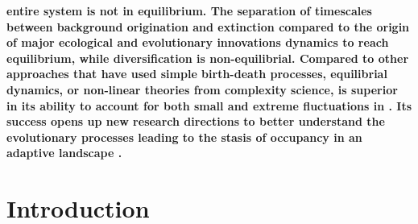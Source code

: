 \documentclass[12pt]{article}
\newenvironment{sciabstract} 
{\bfseries}
{}
\providecommand{\DIFadd}[1]{{\color{blue}{#1}}} %
\providecommand{\DIFdel}[1]{{\protect\color{red}\sout{}}}                      %
\providecommand{\DIFaddbegin}{} %
\providecommand{\DIFaddend}{} %
\providecommand{\DIFdelbegin}{} %
\providecommand{\DIFdelend}{} %
\newcommand{\DIFscaledelfig}{0.5}
\newlength{\DIFdelgraphicswidth} %
\newlength{\DIFdelgraphicsheight} %
\newcommand{\DIFaddincludegraphics}[2][]{{\color{blue}\fbox{\DIFOincludegraphics[#1]{#2}}}} %
\newcommand{\DIFdelincludegraphics}[2][]{%
\sbox{\DIFdelgraphicsbox}{\DIFOincludegraphics[#1]{#2}}%
\settoboxwidth{\DIFdelgraphicswidth}{\DIFdelgraphicsbox} %
\settoboxtotalheight{\DIFdelgraphicsheight}{\DIFdelgraphicsbox} %
\scalebox{\DIFscaledelfig}{%
\parbox[b]{\DIFdelgraphicswidth}{\usebox{\DIFdelgraphicsbox}\\[-\baselineskip] \rule{\DIFdelgraphicswidth}{0em}}\llap{\resizebox{\DIFdelgraphicswidth}{\DIFdelgraphicsheight}{%
\setlength{\unitlength}{\DIFdelgraphicswidth}%
\begin{picture}(1,1)%
\thicklines\linethickness{2pt} %
{\color[rgb]{1,0,0}\put(0,0){\framebox(1,1){}}}%
{\color[rgb]{1,0,0}\put(0,0){\line( 1,1){1}}}%
{\color[rgb]{1,0,0}\put(0,1){\line(1,-1){1}}}%
\end{picture}%
}\hspace*{3pt}}} %
} %
\DeclareRobustCommand{\DIFaddbegin}{\DIFOaddbegin \let\includegraphics\DIFaddincludegraphics} %
\DeclareRobustCommand{\DIFaddend}{\DIFOaddend \let\includegraphics\DIFOincludegraphics} %
\DeclareRobustCommand{\DIFdelbegin}{\DIFOdelbegin \let\includegraphics\DIFdelincludegraphics} %
\DeclareRobustCommand{\DIFdelend}{\DIFOaddend \let\includegraphics\DIFOincludegraphics} %
\begin{document}
\begin{sciabstract}
{  entire system is not in equilibrium.
  }\DIFaddend The separation of timescales between background origination and
  extinction \DIFaddbegin \DIFadd{within clades }\DIFaddend compared to the origin of major ecological
  and evolutionary innovations \DIFdelbegin \DIFdel{between orders allow within-order
}\DIFdelend \DIFaddbegin \DIFadd{leading to new orders and families
  allows within-clade }\DIFaddend dynamics to reach equilibrium, while
  \DIFdelbegin \DIFdel{between-order }\DIFdelend \DIFaddbegin \DIFadd{between-clade }\DIFaddend diversification is non-equilibrial\DIFdelbegin \DIFdel{, driven by major evolutionary innovations}\DIFdelend .
%
  \DIFaddbegin \DIFadd{This between clade non-equilibrium accounts for the fat-tailed
  nature of the system as a whole.
  The distribution of shifts in diversification dynamics across orders
  and families is consistent with niche conservatism and pulsed
  exploration of adaptive landscapes by higher taxa.
  }\DIFaddend Compared to other approaches that have used simple birth-death
  processes, \DIFaddbegin \DIFadd{simple }\DIFaddend equilibrial dynamics, or non-linear theories from
  complexity science, \DIFdelbegin \DIFdel{super-statistics }\DIFdelend \DIFaddbegin \DIFadd{superstatistics }\DIFaddend is superior in its ability to
  account for both small and extreme fluctuations in \DIFdelbegin \DIFdel{fossil diversity}\DIFdelend \DIFaddbegin \DIFadd{the richness of
  fossil taxa}\DIFaddend .
% 
  Its success opens up new research directions to better understand
  the \DIFdelbegin \DIFdel{universal nature of non-equilibrium dynamics across disparate systems
of interest---from societal to physical to biological.  Specifically
in the biological case, research is motivated to understand the
}\DIFdelend evolutionary processes leading to the stasis of \DIFdelbegin \DIFdel{order-level }\DIFdelend \DIFaddbegin \DIFadd{order- and
  family-level }\DIFaddend occupancy in an adaptive landscape \DIFdelbegin \DIFdel{punctuated by
  innovations between orders}\DIFdelend \DIFaddbegin \DIFadd{interrupted by
  innovations that lead to novel forms}\DIFaddend .
\end{sciabstract}

\clearpage
\baselineskip24pt

\section{Introduction}
\end{document}

